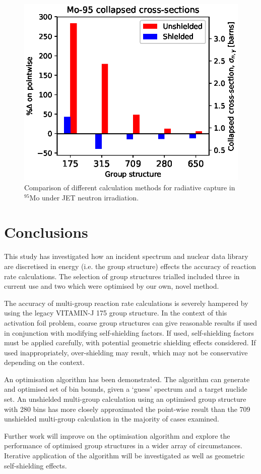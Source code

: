 \begin{figure}[H]
  \centering
  \includegraphics[width=\linewidth]{Mo-95.eps}
  \caption{Comparison of different calculation methods for radiative capture in $^{95}$Mo under JET neutron irradiation.}
  \label{fig:molybdenum-95}
\end{figure}

\section{Conclusions}
This study has investigated how an incident spectrum and nuclear data library are discretised in energy (i.e. the group structure) effects the accuracy of reaction rate calculations. The selection of group structures trialled included three in current use and two which were optimised by our own, novel method.

The accuracy of multi-group reaction rate calculations is severely hampered by using the legacy VITAMIN-J 175 group structure. In the context of this activation foil problem, coarse group structures can give reasonable results if used in conjunction with modifying self-shielding factors. If used, self-shielding factors must be applied carefully, with potential geometric shielding effects considered. If used inappropriately, over-shielding may result, which may not be conservative depending on the context.

An optimisation algorithm has been demonstrated. The algorithm can generate and optimised set of bin bounds, given a `guess' spectrum and a target nuclide set. An unshielded multi-group calculation using an optimised group structure with 280 bins has more closely approximated the point-wise result than the 709 unshielded multi-group calculation in the majority of cases examined.

Further work will improve on the optimisation algorithm and explore the performance of optimised group structures in a wider array of circumstances. Iterative application of the algorithm will be investigated as well as geometric self-shielding effects. 

